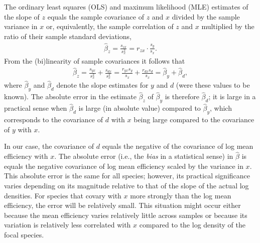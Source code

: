 \documentclass[
]{article}
\theoremstyle{definition}
\theoremstyle{definition}
\theoremstyle{definition}
\theoremstyle{definition}
\theoremstyle{remark}
\begin{document}
The ordinary least squares (OLS) and maximum likelihood (MLE) estimates of the slope of \(z\) equals the sample covariance of \(z\) and \(x\) divided by the sample variance in \(x\) or, equivalently, the sample correlation of \(z\) and \(x\) multiplied by the ratio of their sample standard deviations,
\begin{align}
  \hat \beta_z = \frac{s_{zx}}{s^2_x} = r_{zx} \cdot \frac{s_y}{s_x}.
\end{align}
From the (bi)linearity of sample covariances it follows that
\begin{align}
  \hat \beta_z 
  = \frac{s_{yx}}{s^2_x} + \frac{s_{dx}}{s^2_x} 
  = \frac{r_{yx} s_y}{s_x} + \frac{r_{dx} s_d}{s_x} 
  = \hat \beta_y + \hat \beta_d,
\end{align}
where \(\hat \beta_y\) and \(\hat \beta_d\) denote the slope estimates for \(y\) and \(d\) (were these values to be known).
The absolute error in the estimate \(\hat \beta_{z}\) of \(\hat \beta_{y}\) is therefore \(\hat \beta_{d}\); it is large in a practical sense when \(\hat \beta_{d}\) is large (in absolute value) compared to \(\hat \beta_{y}\), which corresponds to the covariance of \(d\) with \(x\) being large compared to the covariance of \(y\) with \(x\).

In our case, the covariance of \(d\) equals the negative of the covariance of log mean efficiency with \(x\).
The absolute error (i.e., the \emph{bias} in a statistical sense) in \(\hat \beta\) is equals the negative covariance of log mean efficiency scaled by the variance in \(x\).
This absolute error is the same for all species; however, its practical significance varies depending on its magnitude relative to that of the slope of the actual log densities.
For species that covary with \(x\) more strongly than the log mean efficiency, the error will be relatively small.
This situation might occur either because the mean efficiency varies relatively little across samples or because its variation is relatively less correlated with \(x\) compared to the log density of the focal species.
\end{document}
